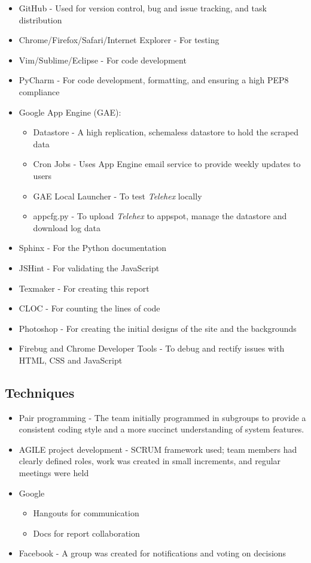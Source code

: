 \documentclass[12pt, a4paper]{article}
\begin{document}
\begin{itemize}
\item GitHub - Used for version control, bug and issue tracking, and task distribution
\item Chrome/Firefox/Safari/Internet Explorer - For testing
\item Vim/Sublime/Eclipse  - For code development
\item PyCharm - For code development, formatting, and ensuring a high PEP8 compliance
\item Google App Engine (GAE):
\begin{itemize}
\item Datastore - A high replication, schemaless datastore to hold the scraped data
\item Cron Jobs - Uses App Engine email service to provide weekly updates to users
\item GAE Local Launcher - To test \textit{Telehex} locally
\item appcfg.py - To upload \textit{Telehex} to appspot, manage the datastore and download log data
\end{itemize}
\item Sphinx - For the Python documentation
\item JSHint - For validating the JavaScript
\item Texmaker - For creating this report
\item CLOC - For counting the lines of code
\item Photoshop - For creating the initial designs of the site and the backgrounds
\item Firebug and Chrome Developer Tools - To debug and rectify issues with HTML, CSS and JavaScript
\end{itemize}


\subsection{Techniques}
\begin{itemize}
\item Pair programming - The team initially programmed in subgroups to provide a consistent coding style and a more succinct understanding of system features. 
\item AGILE project development - SCRUM framework used; team members had clearly defined roles, work was created in small increments, and regular meetings were held
\item Google
\begin{itemize}
\item Hangouts for communication
\item Docs for report collaboration
\end{itemize}
\item Facebook - A group was created for notifications and voting on decisions
\end{itemize}
\end{document}
